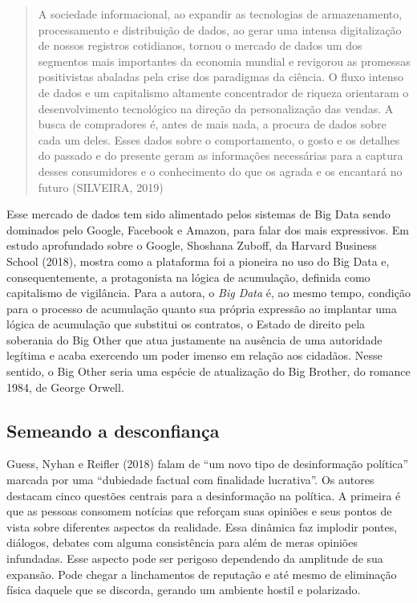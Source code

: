 \begin{quote}
A sociedade informacional, ao expandir as tecnologias de armazenamento,
processamento e distribuição de dados, ao gerar uma intensa
digitalização de nossos registros cotidianos, tornou o mercado de dados
um dos segmentos mais importantes da economia mundial e revigorou as
promessas positivistas abaladas pela crise dos paradigmas da ciência. O
fluxo intenso de dados e um capitalismo altamente concentrador de
riqueza orientaram o desenvolvimento tecnológico na direção da
personalização das vendas. A busca de compradores é, antes de mais nada,
a procura de dados sobre cada um deles. Esses dados sobre o
comportamento, o gosto e os detalhes do passado e do presente geram as
informações necessárias para a captura desses consumidores e o
conhecimento do que os agrada e os encantará no futuro (SILVEIRA, 2019)
\end{quote}

Esse mercado de dados tem sido alimentado pelos sistemas de Big Data
sendo dominados pelo Google, Facebook e Amazon, para falar dos mais
expressivos. Em estudo aprofundado sobre o Google, Shoshana Zuboff, da
Harvard Business School (2018), mostra como a plataforma foi a pioneira
no uso do Big Data e, consequentemente, a protagonista na lógica de
acumulação, definida como capitalismo de vigilância. Para a autora, o
\emph{Big Data} é, ao mesmo tempo, condição para o processo de
acumulação quanto sua própria expressão ao implantar uma lógica de
acumulação que substitui os contratos, o Estado de direito pela
soberania do Big Other que atua justamente na ausência de uma autoridade
legítima e acaba exercendo um poder imenso em relação aos cidadãos.
Nesse sentido, o Big Other seria uma espécie de atualização do Big
Brother, do romance 1984, de George Orwell.

\subsection{Semeando a desconfiança}

Guess, Nyhan e Reifler (2018) falam de ``um novo tipo de desinformação
política'' marcada por uma ``dubiedade factual com finalidade
lucrativa''. Os autores destacam cinco questões centrais para a
desinformação na política. A primeira é que as pessoas consomem notícias
que reforçam suas opiniões e seus pontos de vista sobre diferentes
aspectos da realidade. Essa dinâmica faz implodir pontes, diálogos,
debates com alguma consistência para além de meras opiniões infundadas.
Esse aspecto pode ser perigoso dependendo da amplitude de sua expansão.
Pode chegar a linchamentos de reputação e até mesmo de eliminação física
daquele que se discorda, gerando um ambiente hostil e polarizado.

